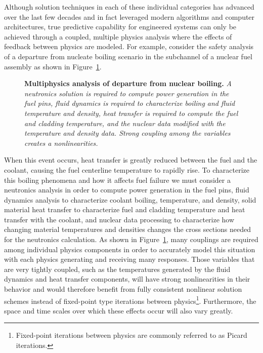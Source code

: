Although solution techniques in each of these individual categories
has advanced over the last few decades and in fact leveraged modern
algorithms and computer architectures, true predictive capability for
engineered systems can only be achieved through a coupled, multiple
physics analysis where the effects of feedback between physics are
modeled. For example, consider the safety analysis of a departure from
nucleate boiling scenario in the subchannel of a nuclear fuel assembly
as shown in Figure~\ref{fig:dnb_example}.
\begin{figure}[htpb!]
  \begin{center}
    \scalebox{1.5}{
       }
  \end{center}
  \caption{\textbf{Multiphysics analysis of departure from nuclear
      boiling.} \textit{A neutronics solution is required to compute
      power generation in the fuel pins, fluid dynamics is required to
      characterize boiling and fluid temperature and density, heat
      transfer is required to compute the fuel and cladding
      temperature, and the nuclear data modified with the temperature
      and density data. Strong coupling among the variables creates a
      nonlinearities.}}
  \label{fig:dnb_example}
\end{figure}
When this event occurs, heat transfer is greatly reduced between the
fuel and the coolant, causing the fuel centerline temperature to
rapidly rise. To characterize this boiling phenomena and how it
affects fuel failure we must consider a neutronics analysis in order
to compute power generation in the fuel pins, fluid dynamics analysis
to characterize coolant boiling, temperature, and density, solid
material heat transfer to characterize fuel and cladding temperature
and heat transfer with the coolant, and nuclear data processing to
characterize how changing material temperatures and densities changes
the cross sections needed for the neutronics calculation. As shown in
Figure~\ref{fig:dnb_example}, many couplings are required among
individual physics components in order to accurately model this
situation with each physics generating and receiving many
responses. Those variables that are very tightly coupled, such as the
temperatures generated by the fluid dynamics and heat transfer
components, will have strong nonlinearities in their behavior and
would therefore benefit from fully consistent nonlinear solution
schemes instead of fixed-point type iterations between
physics\footnote{Fixed-point iterations between physics are commonly
  referred to as Picard iterations.}. Furthermore, the space and time
scales over which these effects occur will also vary greatly.

